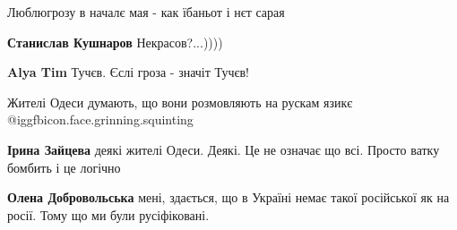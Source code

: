 Люблюгрозу в началє мая - как їбаньот і нєт сарая

\begin{itemize}
 
\textbf{Станислав Кушнаров} Некрасов?...))))

 
\textbf{Alya Tim} Тучєв. Єслі гроза - значіт Тучєв!
\end{itemize}

 
Жителі Одеси думають, що вони розмовляють на рускам язикє @igg{fbicon.face.grinning.squinting} 

\begin{itemize}
 
\textbf{Ірина Зайцева} деякі жителі Одеси. Деякі. Це не означає що всі. Просто ватку бомбить і це логічно

 
\textbf{Олена Добровольська} мені, здається, що в Україні немає такої російської як на росії. Тому що ми були русіфіковані.
\end{itemize}


